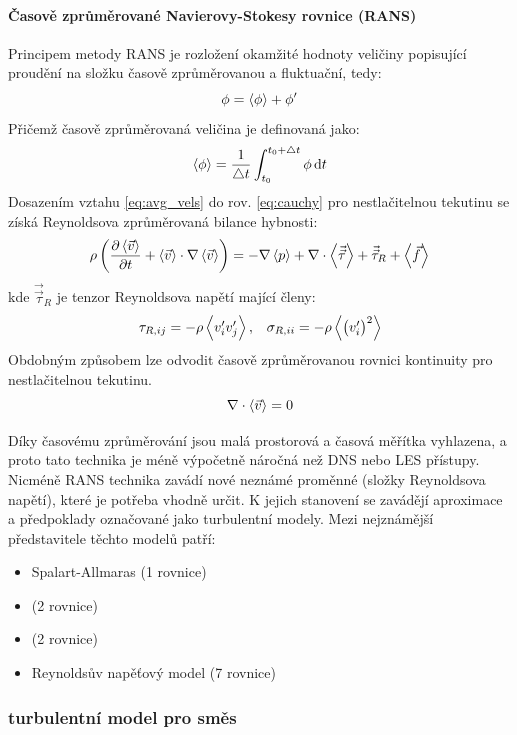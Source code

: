 \paragraph{Časově zprůměrované Navierovy-Stokesy rovnice (RANS)}
Principem metody RANS je rozložení okamžité hodnoty veličiny popisující proudění na složku časově zprůměrovanou a fluktuační, tedy:
\begin{equation}
  \phi = \left< \phi \right> + \phi'
  \label{eq:avg_vels}
\end{equation}
Přičemž časově zprůměrovaná veličina je definovaná jako:
\begin{equation}
  \left< \phi \right>  = \frac{1}{\bigtriangleup t} \int_{t_{0}}^{t_{0} + \bigtriangleup t} \phi\,\mathrm{d}t
  \label{eq:phi_avg}
\end{equation}
Dosazením vztahu \ref{eq:avg_vels} do rov. \ref{eq:cauchy} pro nestlačitelnou tekutinu se získá Reynoldsova zprůměrovaná bilance hybnosti:  
\begin{equation}
    \rho \left( \frac{\partial \left< \vec{v} \right>}{\partial t} + \left< \vec{v} \right> \cdot \nabla  \left< \vec{v} \right> \right) = -\nabla \left< p \right> +  \nabla \cdot \left< \vec{\vec{\tau}} \right> + \vec{\vec{\tau}}_{R} + \left< \vec{f} \right>
  	\label{eq:cauchy_avg}
\end{equation} 
kde $\vec{\vec{\tau}}_{R}$ je tenzor Reynoldsova napětí mající členy: 
\begin{equation}
    \begin{array}{cc}
      \tau_{R,ij} = -\rho\left< v_{i}'v_{j}' \right>, & \sigma_{R,ii} = -\rho\left< \left(v_{i}'\right)^{2} \right>
      \end{array}
\end{equation}
Obdobným způsobem lze odvodit časově zprůměrovanou rovnici kontinuity pro nestlačitelnou tekutinu.
\begin{equation}
	\nabla \cdot \left< \vec{v} \right> = 0
	\label{eq:conti1simp_avg}
\end{equation}  

Díky časovému zprůměrování jsou malá prostorová a časová měřítka vyhlazena, a proto tato technika je méně výpočetně náročná než DNS nebo LES přístupy. Nicméně RANS technika zavádí nové neznámé proměnné (složky Reynoldsova napětí), které je potřeba vhodně určit. K jejich stanovení se zavádějí aproximace a předpoklady označované jako turbulentní modely. Mezi nejznámější představitele těchto modelů patří: 
\begin{itemize}[itemsep=0pt,parsep=0pt,partopsep=0pt,topsep=0pt]
  \item Spalart-Allmaras (1 rovnice) 
  \item \keps{} (2 rovnice) 
  \item \komg{} (2 rovnice) 
  \item Reynoldsův napěťový model (7 rovnice)
\end{itemize}

\subsubsection{\kepsb{} turbulentní model pro směs}
